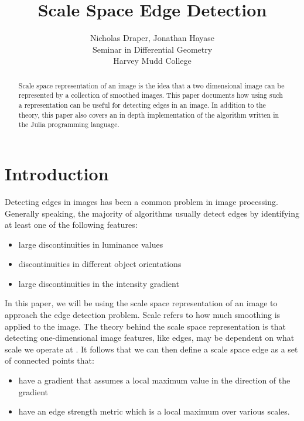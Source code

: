 \documentclass{article}
\title{Scale Space Edge Detection}
\author{
  Nicholas Draper, Jonathan Hayase\\
  Seminar in Differential Geometry\\
  Harvey Mudd College
}
\begin{document}
\maketitle

\begin{abstract}
  Scale space representation of an image is the idea that a two dimensional image can be represented by a collection of smoothed images.
  This paper documents how using such a representation can be useful for detecting edges in an image.
  In addition to the theory, this paper also covers an in depth implementation of the algorithm written in the Julia programming language.
\end{abstract}

\section{Introduction}
Detecting edges in images has been a common problem in image processing.  
Generally speaking, the majority of algorithms usually detect edges by identifying at least one of the following features:
\begin{itemize}
\item large discontinuities in luminance values
\item discontinuities in different object orientations
\item large discontinuities in the intensity gradient
\end{itemize}
In this paper, we will be using the scale space representation of an image to approach the edge detection problem.
Scale refers to how much smoothing is applied to the image. 
The theory behind the scale space representation is that detecting one-dimensional image features, like edges, may be dependent on what scale we operate at \cite{Lindeberg1998}. 
It follows that we can then define a scale space edge as a set of connected points that:
\begin{itemize}
\item have a gradient that assumes a local maximum value in the direction of the gradient\cite{Lindeberg1998}
\item have an edge strength metric which is a local maximum over various scales\cite{Lindeberg1998}.
\end{itemize}
\end{document}
